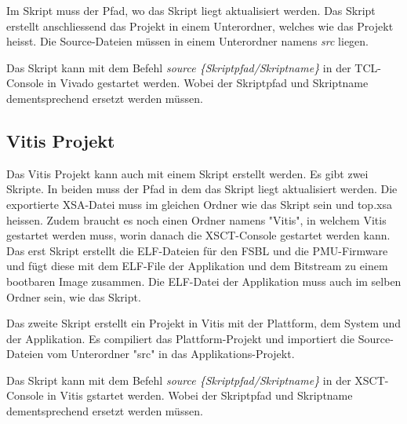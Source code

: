 Im Skript muss der Pfad, wo das Skript liegt aktualisiert werden. Das Skript erstellt anschliessend das Projekt in einem Unterordner, welches wie das Projekt heisst. Die Source-Dateien müssen in einem Unterordner namens \textit{src} liegen.

Das Skript kann mit dem Befehl \textit{source \{Skriptpfad/Skriptname\}} in der TCL-Console in Vivado gestartet werden. Wobei der Skriptpfad und Skriptname dementsprechend ersetzt werden müssen.

\subsection{Vitis Projekt}
Das Vitis Projekt kann auch mit einem Skript erstellt werden. Es gibt zwei Skripte. In beiden muss der Pfad in dem das Skript liegt aktualisiert werden. Die exportierte XSA-Datei muss im gleichen Ordner wie das Skript sein und top.xsa heissen. Zudem braucht es noch einen Ordner namens "Vitis", in welchem Vitis gestartet werden muss, worin danach die XSCT-Console gestartet werden kann. Das erst Skript erstellt die ELF-Dateien für den FSBL und die PMU-Firmware und fügt diese mit dem ELF-File der Applikation und dem Bitstream zu einem bootbaren Image zusammen. Die ELF-Datei der Applikation muss auch im selben Ordner sein, wie das Skript.

Das zweite Skript erstellt ein Projekt in Vitis mit der Plattform, dem System und der Applikation. Es compiliert das Plattform-Projekt und importiert die Source-Dateien vom Unterordner "src" in das Applikations-Projekt.  

Das Skript kann mit dem Befehl \textit{source \{Skriptpfad/Skriptname\}} in der XSCT-Console in Vitis gstartet werden. Wobei der Skriptpfad und Skriptname dementsprechend ersetzt werden müssen.

